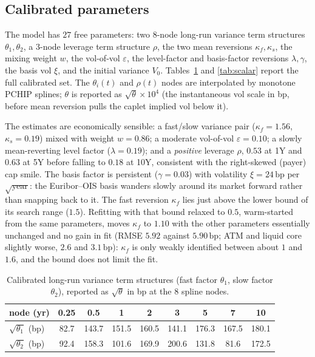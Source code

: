 \documentclass[11pt]{article}
\newcommand{\bp}{\,\text{bp}}
\begin{document}
\FloatBarrier
\subsection{Calibrated parameters}
The model has \(27\) free parameters: two \(8\)-node long-run variance term structures
\(\theta_1,\theta_2\), a \(3\)-node leverage term structure \(\rho\), the two mean reversions
\(\kappa_f,\kappa_s\), the mixing weight \(w\), the vol-of-vol \(\varepsilon\), the level-factor and
basis-factor reversions \(\lambda,\gamma\), the basis vol \(\xi\), and the initial variance
\(V_0\). Tables~\ref{tab:theta} and \ref{tab:scalar} report the full calibrated set. The
\(\theta_i(t)\) and \(\rho(t)\) nodes are interpolated by monotone PCHIP splines; \(\theta\) is
reported as \(\sqrt{\theta}\times10^4\) (the instantaneous vol scale in bp, before mean reversion
pulls the caplet implied vol below it).

The estimates are economically sensible: a fast/slow variance pair (\(\kappa_f=1.56\),
\(\kappa_s=0.19\)) mixed with weight \(w=0.86\); a moderate vol-of-vol \(\varepsilon=0.10\); a
slowly mean-reverting level factor (\(\lambda=0.19\)); and a \emph{positive} leverage \(\rho\),
\(0.53\) at 1Y and \(0.63\) at 5Y before falling to \(0.18\) at 10Y, consistent with the right-skewed
(payer) cap smile. The basis factor is persistent (\(\gamma=0.03\)) with volatility
\(\xi=24\bp\) per \(\sqrt{\text{year}}\): the Euribor--OIS basis wanders slowly around its market
forward rather than snapping back to it. The fast reversion \(\kappa_f\) lies just above the lower
bound of its search range (\(1.5\)). Refitting with that bound relaxed to \(0.5\), warm-started from
the same parameters, moves \(\kappa_f\) to \(1.10\) with the other parameters essentially unchanged
and no gain in fit (RMSE \(5.92\) against \(5.90\bp\); ATM and liquid core slightly worse, \(2.6\) and
\(3.1\bp\)): \(\kappa_f\) is only weakly identified between about \(1\) and \(1.6\), and the bound does
not limit the fit.

\begin{table}[!htbp]
\centering
\begin{tabular}{lcccccccc}
\toprule
node (yr) & 0.25 & 0.5 & 1 & 2 & 3 & 5 & 7 & 10 \\
\midrule
\(\sqrt{\theta_1}\) (bp) & 82.7 & 143.7 & 151.5 & 160.5 & 141.1 & 176.3 & 167.5 & 180.1 \\
\(\sqrt{\theta_2}\) (bp) & 92.4 & 158.3 & 101.6 & 169.9 & 200.6 & 131.8 & 81.6 & 172.5 \\
\bottomrule
\end{tabular}
\caption{Calibrated long-run variance term structures (fast factor \(\theta_1\), slow factor
\(\theta_2\)), reported as \(\sqrt{\theta}\) in bp at the \(8\) spline nodes.}
\label{tab:theta}
\end{table}
\end{document}
